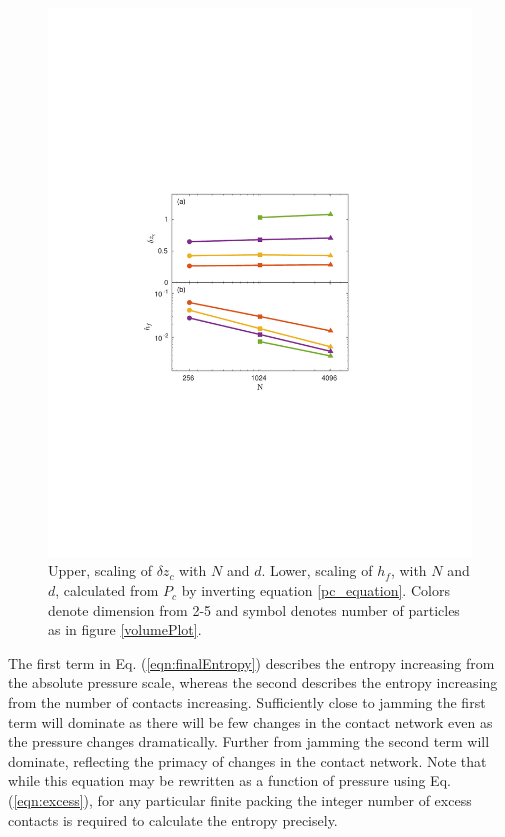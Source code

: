 \begin{figure}[t!]
\centering
\includegraphics[width=\columnwidth, trim=138 254 176 268, clip]{forceVolumeEntropyPaper/lnhg.pdf}
\caption{Upper, scaling of $\delta z_c$ with $N$ and $d$. Lower, scaling of $h_f$, with $N$ and $d$, calculated from $P_c$ by inverting equation \ref{pc_equation}.  Colors denote dimension from 2-5 and symbol denotes number of particles as in figure \ref{volumePlot}. }
\label{lnhgPlot}
\end{figure}

The first term in Eq. (\ref{eqn:finalEntropy}) describes the entropy increasing from the absolute pressure scale, whereas the second describes the entropy increasing from the number of contacts increasing. Sufficiently close to jamming the first term will dominate as there will be few changes in the contact network even as the pressure changes dramatically. Further from jamming the second term will dominate, reflecting the primacy of changes in the contact network.
Note that while this equation may be rewritten as a function of pressure using Eq. (\ref{eqn:excess}), for any particular finite packing the integer number of excess contacts is required to calculate the entropy precisely.


